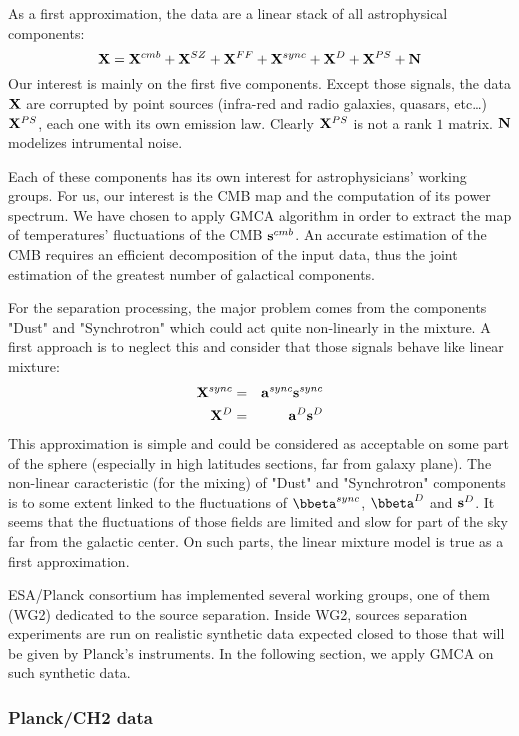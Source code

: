 As a first approximation, the data are a linear stack of all astrophysical components: 
\begin{equation}
{\bf X} = {\bf X}^{cmb} + {\bf X}^{SZ}  + {\bf X}^{FF} + {\bf X}^{sync} + {\bf X}^{D} + {\bf X}^{PS} + {\bf N}
\end{equation}
Our interest is mainly on the first five components. Except those signals, the data $\bf X$ are corrupted by point sources (infra-red and radio galaxies, quasars, etc\ldots) 
${\bf X}^{PS}$, each one with its own emission law. Clearly ${\bf X}^{PS}$ is not a rank $1$ matrix. $\bf N$ modelizes intrumental noise.

Each of these components has its own interest for astrophysicians' working groups. For us, our interest is the CMB map and the computation of its power spectrum. 
We have chosen to apply GMCA algorithm in order to extract the map of temperatures' fluctuations of the CMB ${\bf s}^{cmb}$. An accurate estimation of the CMB 
requires an efficient decomposition of the input data, thus the joint estimation of the greatest number of galactical components.

For the separation processing, the major problem comes from the components "Dust" and "Synchrotron" which could act quite non-linearly in the mixture. A first approach is 
to neglect this and consider that those signals behave like linear mixture:
\begin{eqnarray}
{\bf X}^{sync} & = & {\bf a}^{sync} {\bf s}^{sync}\\
{\bf X}^{D} & = & {\bf a}^{D} {\bf s}^{D}
\end{eqnarray}
This approximation is simple and could be considered as acceptable on some part of the sphere (especially in high latitudes sections, far from galaxy plane). The non-linear caracteristic 
(for the mixing) of "Dust" and "Synchrotron" components is to some extent linked to the fluctuations of $\bbeta^{sync}$, $\bbeta^{D}$ and ${\bf s}^{D}$. It seems that the fluctuations of 
those fields are limited and slow for part of the sky far from the galactic center. On such parts, the linear mixture model is true as a first approximation.

ESA/Planck consortium has implemented several working groups, one of them (WG2) dedicated to the source separation. Inside WG2, sources separation experiments are run on realistic 
synthetic data expected closed to those that will be given by Planck's instruments. In the following section, we apply GMCA on such synthetic data.

\subsubsection{Planck/CH2 data}

